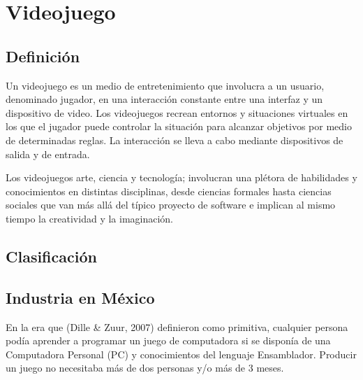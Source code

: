 \section{Videojuego}
			\subsection{Definición}
			Un videojuego es un medio de entretenimiento
			que involucra a un usuario, denominado jugador, en
			una interacción constante entre una interfaz y un
			dispositivo de video. Los videojuegos recrean
			entornos y situaciones virtuales en los que el jugador
			puede controlar la situación para
			alcanzar objetivos por medio de determinadas reglas.
			La interacción se lleva a cabo mediante
			dispositivos de salida y de entrada.
		
			Los videojuegos arte, ciencia y tecnología;
			involucran una plétora de habilidades y
			conocimientos en distintas disciplinas, desde ciencias
			formales hasta ciencias sociales que van más allá del
			típico proyecto de software e implican al mismo
			tiempo la creatividad y la imaginación.
			
			\subsection{Clasificación}
			\subsection{Industria en México}
			En la era que (Dille \& Zuur, 2007) definieron
			como primitiva, cualquier persona podía aprender a
			programar un juego de computadora si se disponía de
			una Computadora Personal (PC) y conocimientos del
			lenguaje Ensamblador. Producir un juego no
			necesitaba más de dos personas y/o más de 3 meses.	
		

